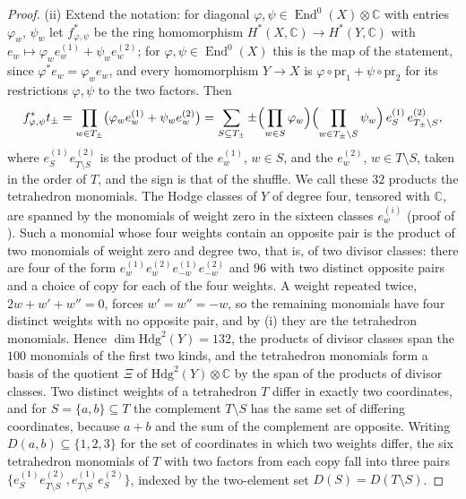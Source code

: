 \documentclass[11pt,reqno]{amsart}
\theoremstyle{plain}
\theoremstyle{definition}
\theoremstyle{remark}
\newcommand{\CC}{\mathbb{C}}
\newcommand{\Hdg}{\mathrm{Hdg}}
\DeclareMathOperator{\End}{End}
\begin{document}
\begin{proof}
(ii) Extend the notation: for diagonal $\varphi,\psi\in\End^{0}(X)\otimes\CC$
with entries $\varphi_{w}$, $\psi_{w}$ let $f_{\varphi,\psi}^{*}$ be the ring
homomorphism $H^{*}(X,\CC)\to H^{*}(Y,\CC)$ with
$e_{w}\mapsto\varphi_{w}e^{(1)}_{w}+\psi_{w}e^{(2)}_{w}$; for
$\varphi,\psi\in\End^{0}(X)$ this is the map of the statement, since
$\varphi^{*}e_{w}=\varphi_{w}e_{w}$, and every homomorphism $Y\to X$ is
$\varphi\circ\mathrm{pr}_{1}+\psi\circ\mathrm{pr}_{2}$ for its restrictions
$\varphi,\psi$ to the two factors. Then
\begin{equation}\label{eq:pullbacktet}
  f_{\varphi,\psi}^{*}t_{\pm}
  =\prod_{w\in T_{\pm}}\bigl(\varphi_{w}e^{(1)}_{w}+\psi_{w}e^{(2)}_{w}\bigr)
  =\sum_{S\subseteq T_{\pm}}\pm\Bigl(\prod_{w\in S}\varphi_{w}\Bigr)
  \Bigl(\prod_{w\in T_{\pm}\setminus S}\psi_{w}\Bigr)\,
  e^{(1)}_{S}\,e^{(2)}_{T_{\pm}\setminus S},
\end{equation}
where $e^{(1)}_{S}e^{(2)}_{T\setminus S}$ is the product of the $e^{(1)}_{w}$,
$w\in S$, and the $e^{(2)}_{w}$, $w\in T\setminus S$, taken in the order of
$T$, and the sign is that of the shuffle. We call these $32$ products the
tetrahedron monomials. The Hodge classes of $Y$ of degree four, tensored with
$\CC$, are spanned by the monomials of weight zero in the sixteen classes
$e^{(i)}_{w}$ (proof of ). Such a monomial whose four
weights contain an opposite pair is the product of two monomials of weight
zero and degree two, that is, of two divisor classes: there are four of the
form $e^{(1)}_{w}e^{(2)}_{w}e^{(1)}_{-w}e^{(2)}_{-w}$ and $96$ with two
distinct opposite pairs and a choice of copy for each of the four weights.
A weight repeated twice, $2w+w'+w''=0$, forces $w'=w''=-w$, so the remaining
monomials have four distinct weights with no opposite pair, and by (i) they
are the tetrahedron monomials. Hence $\dim\Hdg^{2}(Y)=132$, the products of
divisor classes span the $100$ monomials of the first two kinds, and the
tetrahedron monomials form a basis of the quotient $\Xi$ of
$\Hdg^{2}(Y)\otimes\CC$ by the span of the products of divisor classes. Two
distinct weights of a tetrahedron $T$ differ in exactly two coordinates, and
for $S=\{a,b\}\subseteq T$ the complement $T\setminus S$ has the same set of
differing coordinates, because $a+b$ and the sum of the complement are
opposite. Writing $D(a,b)\subseteq\{1,2,3\}$ for the set of coordinates in
which two weights differ, the six tetrahedron monomials of $T$ with two
factors from each copy fall into three pairs
$\{e^{(1)}_{S}e^{(2)}_{T\setminus S},e^{(1)}_{T\setminus S}e^{(2)}_{S}\}$,
indexed by the two-element set $D(S)=D(T\setminus S)$.


\end{proof}
\end{document}
